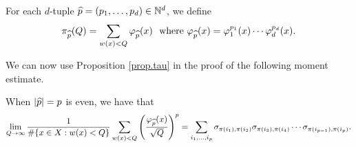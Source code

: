 \documentclass[12pt,a4paper,reqno]{amsart}
\begin{document}
\begin{definition}
For each $d$-tuple $\widehat{p} =(p_1,\ldots,p_d) \in {\mathbb N}^d$, we define
\[
\pi_{\widehat{p}}(Q) = \sum_{w(x) < Q} \varphi_{\widehat{p}}(x) \ \text{ where } \varphi_{\widehat{p}}(x) = \varphi_1^{p_1}(x)\cdots\varphi_d^{p_d}(x).
\]
\end{definition}


We can now use Proposition \ref{prop.tau} in the proof of the following moment estimate.


\begin{proposition}\label{prop.even}
When $|\widehat{p}| = p$ is even, we have that
\[
\lim_{Q\to\infty} \frac{1}{\#\{x \in X: w(x) <Q\}} \sum_{w(x) <Q} \left(\frac{\varphi_{\widehat{p}}(x)}{\sqrt{Q}}\right)^p = \sum_{i_1, \ldots, i_{p} } \sigma_{\pi(i_1),\pi(i_2)} \sigma_{\pi(i_3),\pi(i_4)} \cdots \sigma_{\pi(i_{p-1}), \pi(i_{p})}.
\]
\end{proposition}
\end{document}
